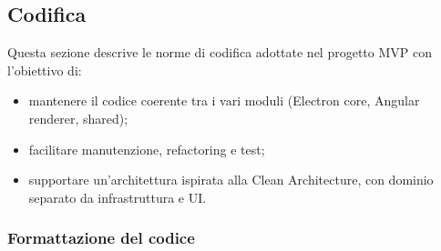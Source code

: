 \documentclass[a4paper,12pt]{article}
\begin{document}
\subsection{Codifica}
Questa sezione descrive le norme di codifica adottate nel progetto MVP con l'obiettivo di:
\begin{itemize}
  \item mantenere il codice coerente tra i vari moduli (Electron core, Angular renderer, shared);
  \item facilitare manutenzione, refactoring e test;
  \item supportare un'architettura ispirata alla Clean Architecture, con dominio separato da infrastruttura e UI.
\end{itemize}

\subsubsection{Formattazione del codice}
\end{document}

